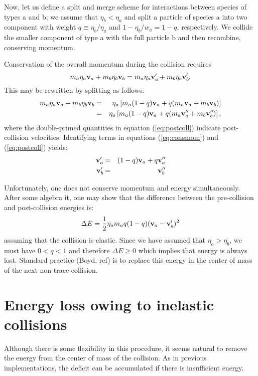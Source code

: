 \documentclass[12pt]{article}
\newcommand*{\myprime}{^{\prime}\mkern-1.2mu}
\newcommand*{\mydprime}{^{\prime\prime}\mkern-1.2mu}
\newcommand{\bv}{{\bf v}}
\newcommand{\va}{\bv_a}
\newcommand{\vb}{\bv_b}
\newcommand{\vap}{\va\myprime}
\newcommand{\vbp}{\vb\myprime}
\begin{document}
Now, let us define a split and merge scheme for interactions between
species of types a and b; we assume that $\eta_b < \eta_a$ and split a
particle of species a into two component with weight $q\equiv \eta_b/\eta_a$
and $1 - \eta_b/w_a = 1 - q$, respectively.  We collide the smaller
component of type a with the full particle b and then recombine,
conserving momentum.

Conservation of the overall momentum during the collision
requires
\begin{equation}
  m_a \eta_a \va + m_ b \eta_b \vb = m_a \eta_a \vap + m_b \eta_b \vbp.
  \label{eq:consmom}
\end{equation}
This may be rewritten by splitting as follows:
\begin{eqnarray}
  m_a \eta_a \va + m_ b \eta_b \vb &=& \eta_a\left[ m_a (1-q) \va + q(m_a\va +
    m_b \vb) \right] \\ \label{eq:precoll}
  &=& \eta_a\left[ m_a (1-q) \va + q(m_a\va\mydprime +
    m_b \vb\mydprime) \right], \label{eq:postcoll}
\end{eqnarray}
where the double-primed quantities in equation (\ref{eq:postcoll})
indicate post-collision velocities.  Identifying terms in equations
(\ref{eq:consmom}) and (\ref{eq:postcoll}) yields:
\begin{eqnarray}
  \vap &=& (1-q)\va + q\va\mydprime \\
  \vbp &=& \vb\mydprime
\end{eqnarray}

Unfortunately, one does not conserve momentum and energy
simultaneously.  After some algebra it, one may show that the
difference between the pre-collision and post-collision energies is:
\begin{equation}
  \Delta E = \frac12 \eta_a m_a q(1-q)(\va - \vap)^2
\end{equation}
assuming that the collision is elastic. Since we have assumed that
$\eta_a>\eta_b$, we must have $0<q<1$ and therefore $\Delta E \ge 0$ which
implies that energy is always lost.  Standard practice (Boyd, ref) is
to replace this energy in the center of mass of the next non-trace
collision.

\section{Energy loss owing to inelastic collisions}

Although there is some flexibility in this procedure, it seems natural
to remove the energy from the center of mass of the collision.  As in
previous implementations, the deficit can be accumulated if there is
insufficient energy.
\end{document}
